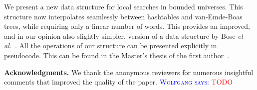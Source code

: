 \documentclass[a4paper,11pt]{article}
\newcommand{\etal}{\emph{et al.}\xspace}
\newcommand{\?}{\mskip1.5mu}
\newcommand{\aremark}[3]{\textcolor{blue}{\textsc{#1 #2:}}
  \textcolor{red}{\textsf{#3}}}
\newcommand{\wolfgang}[2][says]{\aremark{Wolfgang}{#1}{#2}}
\begin{document}
We present a new data structure for local searches
in bounded universes. This structure now interpolates
seamlessly between hashtables and van-Emde-Boas trees,
while requiring only a linear number of words. This provides
an improved, and in our opinion also slightly simpler, version
of a data structure by Bose \etal~\cite{BoseDoDuHoMo13}.
All the operations of our structure can be
presented explicitly in pseudocode. This can be found in the
Master's thesis of the first author~\cite{Ehrhardt15}.

\bigskip
\noindent\textbf{Acknowledgments.}
We thank the anonymous reviewers for numerous
insightful comments that improved the quality of the paper.
\wolfgang{TODO}





\end{document}
